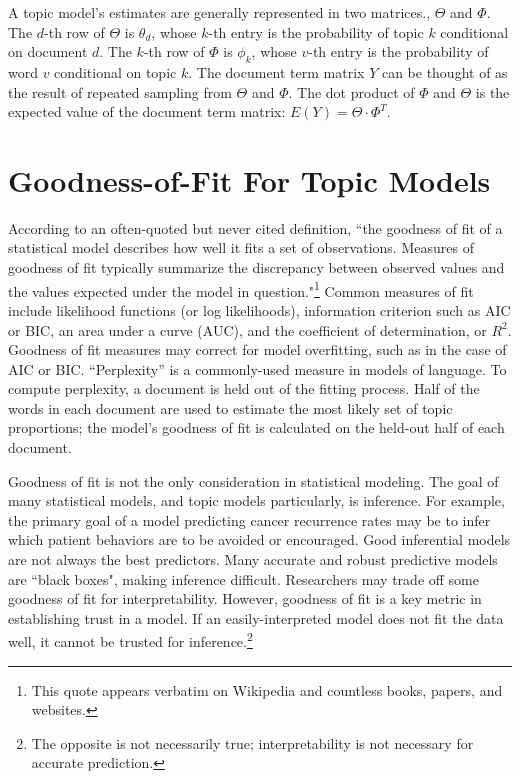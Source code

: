 \documentclass[12pt]{amsart}
\begin{document}
A topic model's estimates are generally represented in two matrices., $\Theta$ and $\Phi$. The $d$-th row of $\Theta$ is $\theta_d$, whose $k$-th entry is the probability of topic $k$ conditional on document $d$. The $k$-th row of $\Phi$ is $\phi_k$, whose $v$-th entry is the probability of word $v$ conditional on topic $k$. The document term matrix $Y$ can be thought of as the result of repeated sampling from $\Theta$ and $\Phi$. The dot product of $\Phi$ and $\Theta$ is the expected value of the document term matrix: $E(Y) = \Theta \cdot \Phi^T$. 

\section{Goodness-of-Fit For Topic Models}

According to an often-quoted but never cited definition, ``the goodness of fit of a statistical model describes how well it fits a set of observations. Measures of goodness of fit typically summarize the discrepancy between observed values and the values expected under the model in question."\footnote{This quote appears verbatim on Wikipedia and countless books, papers, and websites.} Common measures of fit include likelihood functions (or log likelihoods), information criterion such as AIC or BIC, an area under a curve (AUC), and the coefficient of determination, or $R^2$. Goodness of fit measures may correct for model overfitting, such as in the case of AIC or BIC. ``Perplexity'' is a commonly-used measure in models of language. To compute perplexity, a document is held out of the fitting process. Half of the words in each document are used to estimate the most likely set of topic proportions; the model's goodness of fit is calculated on the held-out half of each document.

Goodness of fit is not the only consideration in statistical modeling. The goal of many statistical models, and topic models particularly, is inference. For example, the primary goal of a model predicting cancer recurrence rates may be to infer which patient behaviors are to be avoided or encouraged. Good inferential models are not always the best predictors. Many accurate and robust predictive models are ``black boxes", making inference difficult. Researchers may trade off some goodness of fit for interpretability. However, goodness of fit is a key metric in establishing trust in a model. If an easily-interpreted model does not fit the data well, it cannot be trusted for inference.\footnote{The opposite is not necessarily true; interpretability is not necessary for accurate prediction.} 
\end{document}
